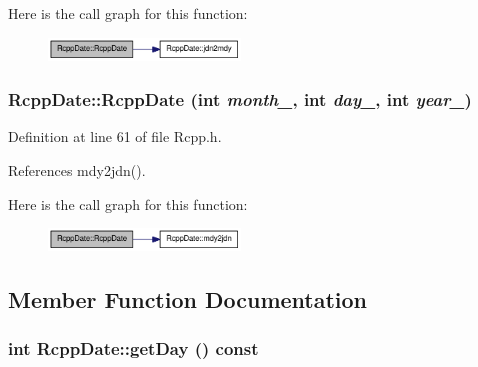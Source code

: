 Here is the call graph for this function:\nopagebreak
\begin{figure}[H]
\begin{center}
\leavevmode
\includegraphics[width=145pt]{classRcppDate_a21adf306ddf84cf792f888d220bb9a3f_cgraph}
\end{center}
\end{figure}
\hypertarget{classRcppDate_a8b96145664d63ec84267870787025fa4}{
\subsubsection[{RcppDate}]{\setlength{\rightskip}{0pt plus 5cm}RcppDate::RcppDate (int {\em month\_\-}, \/  int {\em day\_\-}, \/  int {\em year\_\-})}}
\label{classRcppDate_a8b96145664d63ec84267870787025fa4}


Definition at line 61 of file Rcpp.h.

References mdy2jdn().

Here is the call graph for this function:\nopagebreak
\begin{figure}[H]
\begin{center}
\leavevmode
\includegraphics[width=145pt]{classRcppDate_a8b96145664d63ec84267870787025fa4_cgraph}
\end{center}
\end{figure}


\subsection{Member Function Documentation}
\hypertarget{classRcppDate_a20efbcdddceac536425407b3169fff5a}{
\subsubsection[{getDay}]{\setlength{\rightskip}{0pt plus 5cm}int RcppDate::getDay () const}}
\label{classRcppDate_a20efbcdddceac536425407b3169fff5a}



